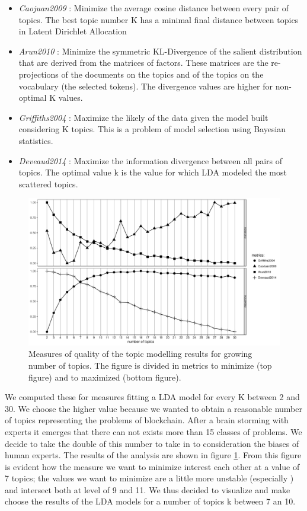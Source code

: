 \documentclass[]{book}
\providecommand{\tightlist}{%
  \setlength{\itemsep}{0pt}\setlength{\parskip}{0pt}}
\theoremstyle{definition}
\theoremstyle{definition}
\theoremstyle{definition}
\theoremstyle{remark}
\begin{document}
\begin{itemize}
\tightlist
\item
  \emph{Caojuan2009} \citep{cao2009density}: Minimize the average cosine
  distance between every pair of topics. The best topic number K has a
  minimal final distance between topics in Latent Dirichlet Allocation
\item
  \emph{Arun2010} \citep{arun2010finding}: Minimize the symmetric
  KL-Divergence of the salient distribution that are derived from the
  matrices of factors. These matrices are the re-projections of the
  documents on the topics and of the topics on the vocabulary (the
  selected tokens). The divergence values are higher for non-optimal K
  values.
\item
  \emph{Griffiths2004} \citep{griffiths2004finding}: Maximize the likely
  of the data given the model built considering K topics. This is a
  problem of model selection using Bayesian statistics.
\item
  \emph{Deveaud2014} \citep{deveaud2014accurate}: Maximize the
  information divergence between all pairs of topics. The optimal value
  k is the value for which LDA modeled the most scattered topics.
\end{itemize}

\begin{figure}

{\centering \includegraphics[width=0.6\linewidth]{_bookdown_files/figures/FindTopicsNumber_plot_bl} 

}

\caption{Measures of quality of the topic modelling results for growing number of topics. The figure is divided in metrics to minimize (top figure) and to maximized (bottom figure).}\label{fig:topicnumsmbl}
\end{figure}

We computed these for measures fitting a LDA model for every K between 2
and 30. We choose the higher value because we wanted to obtain a
reasonable number of topics representing the problems of blockchain.
After a brain storming with experts it emerges that there can not exists
more than 15 classes of problems. We decide to take the double of this
number to take in to consideration the biases of human experts. The
results of the analysis are shown in figure \ref{fig:topicnumsmbl}. From
this figure is evident how the measure we want to minimize interest each
other at a value of 7 topics; the values we want to minimize are a
little more unstable (especially \citep{arun2010finding}) and intersect
both at level of 9 and 11. We thus decided to visualize and make choose
the results of the LDA models for a number of topics k between 7 an 10.
\end{document}
